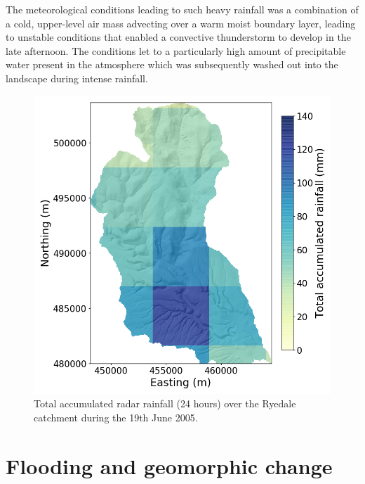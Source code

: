 The meteorological conditions leading to such heavy rainfall was a combination of a cold, upper-level air mass advecting over a warm moist boundary layer, leading to unstable conditions that enabled a convective thunderstorm to develop in the late afternoon. The conditions let to a particularly high amount of precipitable water present in the atmosphere which was subsequently washed out into the landscape during intense rainfall. 

\begin{figure}[htb]
\includegraphics[width=13cm]{chp_events_figures_scripts/figure_ryedale_total_rainfall.png}
\caption{Total accumulated radar rainfall (24 hours) over the Ryedale catchment during the 19th June 2005.}
\label{fig_ryedale_rain_totals}
\end{figure}

\section{Flooding and geomorphic change}

